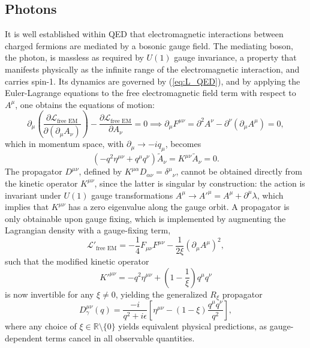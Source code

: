 \subsection{Photons}
It is well established within QED that electromagnetic interactions between charged fermions are mediated by a bosonic gauge field. The mediating boson, the photon, is massless as required by $U(1)$ gauge invariance, a property 
that manifests physically as the infinite range of the electromagnetic interaction, and carries spin-1. Its dynamics are governed by (\ref{eq:L_QED}), and by applying the Euler-Lagrange equations to the free electromagnetic field term with respect to $A^\mu$, one obtains the equations of motion:
\begin{equation}
\partial_\mu \left(\frac{\partial \mathcal{L}_\text{free EM}}
{\partial(\partial_\mu A_\nu)}\right) 
- \frac{\partial \mathcal{L}_\text{free EM}}{\partial A_\nu} = 0 
\implies \partial_\mu F^{\mu \nu} = 
\partial^2 A^\nu - \partial^{\nu}(\partial_\mu A^\mu) = 0,
\end{equation}
\noindent which in momentum space, with $\partial_{\mu} \rightarrow -iq_{\mu}$, 
becomes
\begin{equation}
  \left(-q^2 \eta^{\mu \nu} + q^\mu q^\nu\right)\widetilde{A}_{\nu} 
  = K^{\mu \nu}\widetilde{A}_{\nu} = 0.
\end{equation}
The propagator $D^{\mu \nu}$, defined by $K^{\mu \alpha}D_{\alpha \nu} = \delta^{\mu}{}_{\nu}$, cannot be obtained directly from the kinetic operator $K^{\mu\nu}$, since the latter is singular by construction: the action is invariant under $U(1)$ gauge transformations $A^\mu \rightarrow A'^\mu = A^\mu + \partial^{\mu}\lambda$, which implies that $K^{\mu\nu}$ has a zero eigenvalue along the gauge orbit. A propagator is only obtainable upon gauge fixing, which is implemented by augmenting the Lagrangian density with a gauge-fixing term,
\begin{equation}
\mathcal{L}'_\text{free EM} = -\frac{1}{4}F_{\mu\nu}F^{\mu\nu} 
- \frac{1}{2\xi}\left(\partial_\mu A^\mu\right)^2,
\end{equation}
\noindent such that the modified kinetic operator
\begin{equation}
 K'^{\mu \nu} = -q^2 \eta^{\mu \nu} + 
 \left(1 - \frac{1}{\xi}\right)q^\mu q^\nu
\end{equation}
\noindent is now invertible for any $\xi \neq 0$, yielding the generalized 
$R_\xi$ propagator
\begin{equation}\label{eq:photonprop}
  D^{\mu\nu}_\gamma(q) = \frac{-i}{q^2 + i\epsilon}
  \left[\eta^{\mu\nu} - (1-\xi)\frac{q^\mu q^\nu}{q^2}\right],
\end{equation}
\noindent where any choice of $\xi \in \mathbb{R}\setminus\{0\}$ yields equivalent physical predictions, as gauge-dependent terms cancel in all observable quantities.
